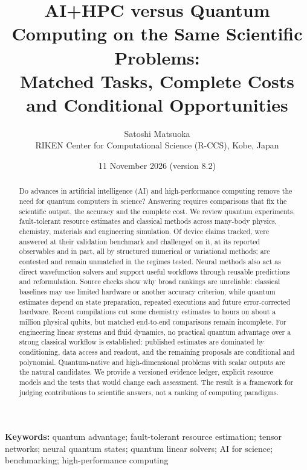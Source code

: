 \documentclass[10pt,a4paper]{article}
\title{\textbf{AI+HPC versus Quantum Computing on the Same Scientific Problems:}\\[3pt]
\Large Matched Tasks, Complete Costs and Conditional Opportunities}
\author{Satoshi Matsuoka\\[2pt]
\small RIKEN Center for Computational Science (R-CCS), Kobe, Japan}
\date{\small 11 November 2026 (version 8.2)}
\begin{document}
\maketitle

\begin{abstract}
\noindent
Do advances in artificial intelligence (AI) and high-performance computing remove the need for quantum computers in science? Answering requires comparisons that fix the scientific output, the accuracy and the complete cost. We review quantum experiments, fault-tolerant resource estimates and classical methods across many-body physics, chemistry, materials and engineering simulation. Of \wTimeline{} device claims tracked, \wTLvalidation{} were answered at their validation benchmark and \wTLchallenged{} challenged on it, \wTLobservables{} at its reported observables and \wTLpartial{} in part, all by structured numerical or variational methods; \wTLcontested{} are contested and \wTLopen{} remain unmatched in the regimes tested. Neural methods also act as direct wavefunction solvers and support useful workflows through reusable predictions and reformulation. Source checks show why broad rankings are unreliable: classical baselines may use limited hardware or another accuracy criterion, while quantum estimates depend on state preparation, repeated executions and future error-corrected hardware. Recent compilations cut some chemistry estimates to hours on about a million physical qubits, but matched end-to-end comparisons remain incomplete. For engineering linear systems and fluid dynamics, no practical quantum advantage over a strong classical workflow is established: published estimates are dominated by conditioning, data access and readout, and the remaining proposals are conditional and polynomial. Quantum-native and high-dimensional problems with scalar outputs are the natural candidates. We provide a versioned evidence ledger, explicit resource models and the tests that would change each assessment. The result is a framework for judging contributions to scientific answers, not a ranking of computing paradigms.
\end{abstract}

\noindent\textbf{Keywords:} quantum advantage; fault-tolerant resource estimation; tensor networks; neural quantum states; quantum linear solvers; AI for science; benchmarking; high-performance computing

\tableofcontents
\newpage
\end{document}
